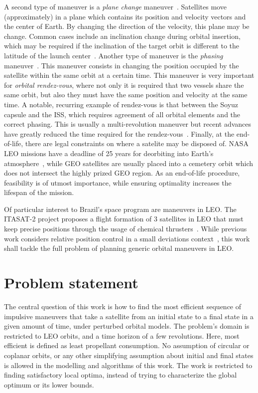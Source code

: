A second type of maneuver is a \textit{plane change} maneuver~\cite{curtis2015orbital}. Satellites move (approximately) in a plane which contains its position and velocity vectors and the center of Earth. By changing the direction of the velocity, this plane may be change. Common cases include an inclination change during orbital insertion, which may be required if the inclination of the target orbit is different to the latitude of the launch center~\cite{curtis2015orbital}. Another type of maneuver is the \textit{phasing} maneuver~\cite{curtis2015orbital}. This maneuver consists in changing the position occupied by the satellite within the same orbit at a certain  time. This maneuver is very important for \textit{orbital rendez-vous}, where not only it is required that two vessels share the same orbit, but also they must have the same position and velocity at the same time. A notable, recurring example of rendez-vous is that between the Soyuz capsule and the ISS, which requires agreement of all orbital elements and the correct phasing. This is usually a multi-revolution maneuver but recent advances have greatly reduced the time required for the rendez-vous~\cite{soyuz_iss}. Finally, at the end-of-life, there are legal constraints on where a satelite may be disposed of. NASA LEO missions have a deadline of 25 years for deorbiting into Earth's atmosphere~\cite{nasa_deorbit}, while GEO satellites are usually placed into a cemetery orbit which does not intersect the highly prized GEO region. As an end-of-life procedure, feasibility is of utmost importance, while ensuring optimality increases the lifespan of the mission.

Of particular interest to Brazil's space program are maneuvers in LEO\@. The ITASAT-2 project proposes a flight formation of 3 satellites in LEO that must keep precise positions through the usage of chemical thrusters~\cite{itasat2_conops}. While previous work considers relative position control in a small deviations context~\cite{itasat2}, this work shall tackle the full problem of planning generic orbital maneuvers in LEO. 


\section{Problem statement}

The central question of this work is how to find the most efficient sequence of impulsive maneuvers that take a satellite from an initial state to a final state in a given amount of time, under perturbed orbital models. The problem's domain is restricted to LEO orbits, and a time horizon of a few revolutions. Here, most efficient is defined as least propellant consumption. No assumption of circular or coplanar orbits, or any other simplifying assumption about initial and final states is allowed in the modelling and algorithms of this work. The work is restricted to finding satisfactory local optima, instead of trying to characterize the global optimum or its lower bounds.

